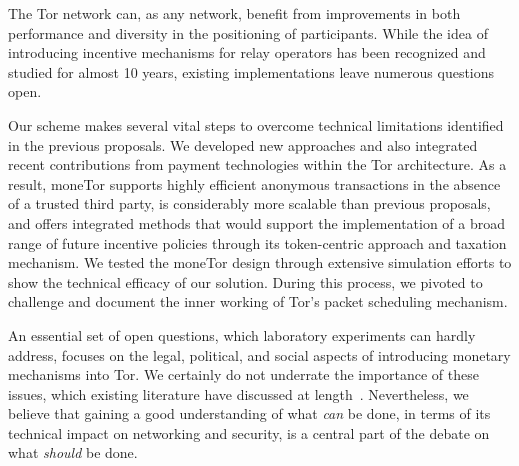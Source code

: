 The Tor network can, as any network, benefit from improvements in both performance and diversity in the positioning of participants.
While the idea of introducing incentive mechanisms for relay operators has been recognized and studied for almost 10 years, existing implementations leave numerous questions open.

Our scheme makes several vital steps to overcome technical limitations identified in the previous proposals.
We developed new approaches and also integrated recent contributions from payment technologies within the Tor architecture.
As a result, moneTor supports highly efficient anonymous transactions in the absence of a trusted third party, is considerably more scalable than previous proposals, and offers integrated methods that would support the implementation of a broad range of future incentive policies through its token-centric approach and taxation mechanism.
We tested the moneTor design through extensive simulation efforts to show the technical efficacy of our solution.
During this process, we pivoted to challenge and document the inner working of Tor's packet scheduling mechanism.

An essential set of open questions, which laboratory experiments can hardly address, focuses on the legal, political, and social aspects of introducing monetary mechanisms into Tor.
We certainly do not underrate the importance of these issues, which existing literature have discussed at length~\cite{jansenblogpost}.
Nevertheless, we believe that gaining a good understanding of what \emph{can} be done, in terms of its technical impact on networking and security, is a central part of the debate on what \emph{should} be done.

